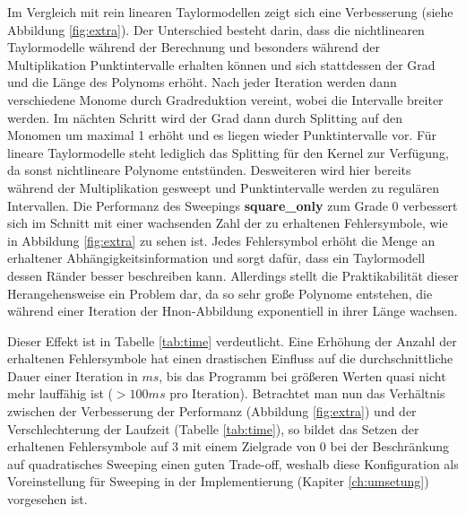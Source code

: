Im Vergleich mit rein linearen Taylormodellen zeigt sich eine Verbesserung (siehe Abbildung \ref{fig:extra}). Der Unterschied besteht darin, dass die nichtlinearen Taylormodelle während der Berechnung und besonders während der Multiplikation Punktintervalle erhalten können und sich stattdessen der Grad und die Länge des Polynoms erhöht. Nach jeder Iteration werden dann verschiedene Monome durch Gradreduktion vereint, wobei die Intervalle breiter werden. Im nächten Schritt wird der Grad dann durch Splitting auf den Monomen um maximal 1 erhöht und es liegen wieder Punktintervalle vor. Für lineare Taylormodelle steht lediglich das Splitting für den Kernel zur Verfügung, da sonst nichtlineare Polynome entstünden. Desweiteren wird hier bereits während der Multiplikation gesweept und Punktintervalle werden zu regulären Intervallen. Die Performanz des Sweepings \textbf{square\_only} zum Grade 0 verbessert sich im Schnitt mit einer wachsenden Zahl der zu erhaltenen Fehlersymbole, wie in Abbildung \ref{fig:extra} zu sehen ist. Jedes Fehlersymbol erhöht die Menge an erhaltener Abhängigkeitsinformation und sorgt dafür, dass ein Taylormodell dessen Ränder besser beschreiben kann. Allerdings stellt die Praktikabilität dieser Herangehensweise ein Problem dar, da so sehr große Polynome entstehen, die während einer Iteration der H\e non-Abbildung exponentiell in ihrer Länge wachsen.
 


 Dieser Effekt ist in Tabelle \ref{tab:time} verdeutlicht. Eine Erhöhung der Anzahl der erhaltenen Fehlersymbole hat einen drastischen Einfluss auf die durchschnittliche Dauer einer Iteration in $ms$, bis das Programm bei größeren Werten quasi nicht mehr lauffähig ist ($>100ms$ pro Iteration). Betrachtet man nun das Verhältnis zwischen der Verbesserung der Performanz (Abbildung \ref{fig:extra}) und der Verschlechterung der Laufzeit (Tabelle \ref{tab:time}), so bildet das Setzen der erhaltenen Fehlersymbole auf 3 mit einem Zielgrade von 0 bei der Beschränkung auf quadratisches Sweeping einen guten Trade-off, weshalb diese Konfiguration als Voreinstellung für Sweeping in der Implementierung (Kapiter \ref{ch:umsetung}) vorgesehen ist.
 
